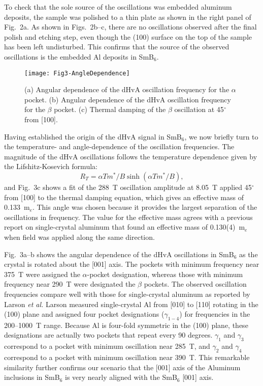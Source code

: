 \documentclass[twocolumn,preprintnumbers,amsmath,amssymb]{revtex4}
\begin{document}
To check that the sole source of the oscillations was embedded aluminum deposits, the sample was polished to a thin plate as shown in the right panel of Fig.~2a.
As shown in Figs.~2b--c, there are no oscillations observed after the final polish and etching step, even though the (100) surface on the top of the sample has been left undisturbed.
This confirms that the source of the observed oscillations is the embedded Al deposits in SmB$_6$.

\begin{figure}[b]
\begin{center}
\texttt{[image: Fig3-AngleDependence]}
\vspace{-0.7cm}
\end{center}
\caption{
(a) Angular dependence of the dHvA oscillation frequency for the $\alpha$ pocket.
(b) Angular dependence of the dHvA oscillation frequency for the $\beta$ pocket.
(c) Thermal damping of the $\beta$ oscillation at 45$^\circ$ from [100].
}\label{fig:angular_dependence}
\end{figure}


Having established the origin of the dHvA signal in SmB$_6$, we now briefly turn to the temperature- and angle-dependence of the oscillation frequencies.
The magnitude of the dHvA oscillations follows the temperature dependence given by the Lifshitz-Kosevich formula:\cite{Shoenberg1984}
\begin{equation}
R_{T}=\alpha{}Tm^*/B\sinh{}(\alpha{}Tm^*/B),
\end{equation}
\noindent and Fig.~3c shows a fit of the 288~T oscillation amplitude at 8.05~T applied 45$^\circ$ from [100] to the thermal damping equation, which gives an effective mass of 0.133~m$_e$.
This angle was chosen because it provides the largest separation of the oscillations in frequency.
The value for the effective mass agrees with a previous report on single-crystal aluminum that found an effective mass of 0.130(4)~m$_e$ when field was applied along the same direction.\cite{Larson1967}

Fig.~3a--b shows the angular dependence of the dHvA oscillations in SmB$_6$ as the crystal is rotated about the [001] axis.
The pockets with minimum frequency near 375~T were assigned the $\alpha$-pocket designation, whereas those with minimum frequency near 290~T were designated the $\beta$ pockets.
The observed oscillation frequencies compare well with those for single-crystal aluminum as reported by Larson \textit{et al.}\cite{Gunnersen1957,Larson1967}
Larson measured single-crystal Al from [010] to [110] rotating in the (100) plane and assigned four pocket designations ($\gamma_{1-4}$) for frequencies in the 200--1000~T range.
Because Al is four-fold symmetric in the (100) plane, these designations are actually two pockets that repeat every 90 degrees.  
$\gamma_1$ and $\gamma_3$ correspond to a pocket with minimum oscillation near 285~T, and $\gamma_2$ and $\gamma_4$ correspond to a pocket with minimum oscillation near 390~T.
This remarkable similarity further confirms our scenario that the [001] axis of the Aluminum inclusions in SmB$_6$ is very nearly aligned with the SmB$_6$ [001] axis.
\end{document}
